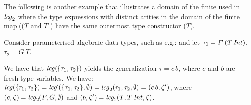 The following is another example that illustrates a domain of the
finite used in ${\it lcg\/}_2$ where the type expressions with distinct
arities in the domain of the finite map (($T$ and $T$ \Int) have the
same outermost type constructor ($T$).

\begin{Example}
  \label{ex-polykindedness}
  
  Consider parameterised algebraic data types, such as e.g.:
  and let $\tau_1 = F\: (T\: {\it Int\/})$, $\tau_2 = G\: T$. 

  We have that ${\it lcg\/}(\{\tau_1,\tau_2\})$ yields the generalization
  $\tau = c\: b$, where $c$ and $b$ are fresh type variables.  We
  have: ${\it lcg\/}(\{\tau_1, \tau_2\}) = {\it lcg\/}'(\{\tau_1,\tau_2\},\emptyset)
  = {\it lcg\/}_2(\tau_1,\tau_2,\emptyset) = (c\:b, \zeta')$, where
  $(c,\zeta) = {\it lcg\/}_2(F,G,\emptyset)$ and $(b,\zeta') =
  {\it lcg\/}_2(T,T\:{\it Int\/},\zeta)$.

\end{Example}

